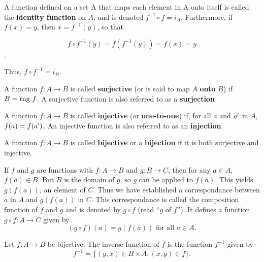 \documentclass[12pt]{article}
\begin{document}
\begin{definition}[Identity]
  A function defined on a set A that maps each element in A
  onto itself is called the \textbf{identity function} on $A$, and is denoted
  $f^{-1}\circ{}f=i_{A}$. Furthermore, if $f(x) = y$, then $x = f^{-1}(y)$, so that

  $$f \circ f^{-1}(y) = f(f^{-1}(y)) = f(x) = y$$.

  Thus, $f \circ f^{-1} = i_{B}$.
\end{definition}

\begin{definition}[Surjective]
  A function $f : A \rightarrow B$ is called \textbf{surjective} (or is said to map $A$
  \textbf{onto} $B$) if $B = \text{rng }f$. A surjective function is also referred to
  as a \textbf{surjection}
\end{definition}

\begin{definition}[Injective]
  A function $f : A \rightarrow B$ is called \textbf{injective} (or \textbf{one-to-one})
  if, for all $a$ and $a'$ in $A$, $f(a) = f(a')$. An injective function
  is also referred to as an \textbf{injection}.
\end{definition}

\begin{definition}[Bijective]
A function $f : A \rightarrow B$ is called \textbf{bijective} or a \textbf{bijection} if
it is both surjective and injective.
\end{definition}

\begin{definition}[Composition]
  If $f$ and $g$ are functions with $f : A  \rightarrow B$ and $g : B \rightarrow C$, then for any
  $a \in A$, $f(a) \in B$. But $B$ is  the domain of $g$, so $g$ can be applied to
  $f(a)$. This yields $g(f(a))$, an element of $C$. Thus we have established a
  correspondance between $a$ in $A$  and $g(f(a))$ in $C$. This correspondance
  is called the composition function of $f$ and  $g$ and is denoted by $g \circ f$
  (read ``$g$ of $f$''). It  defines a function $g \circ f : A \rightarrow  C$ given by $$(g \circ
  f)(a) = g(f(a)) \text{ for all } a \in A.$$
\end{definition}

\begin{definition}[Inverse]
  Let $f : A \rightarrow B$ be bijective. The inverse function of $f$ is the function
  $f^{-1}$ given by $$f^{-1} = \{ (y,x) \in B \times A : (x,y) \in f \}.$$
\end{definition}
\end{document}
